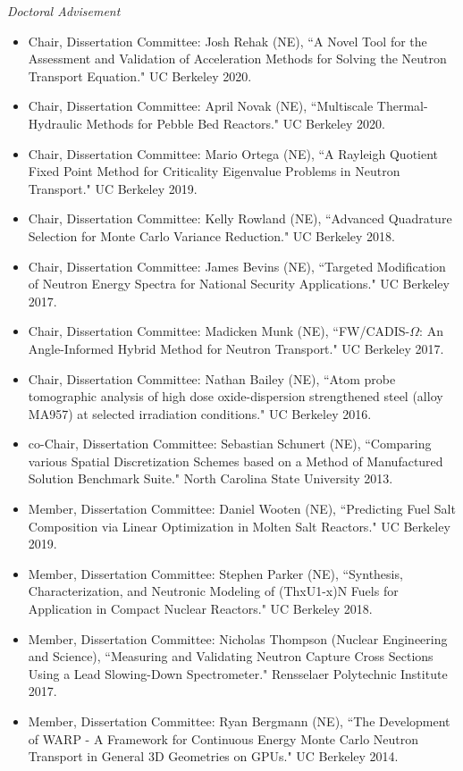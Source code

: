 \textit{Doctoral Advisement}
\begin{itemize}
\item Chair, Dissertation Committee: Josh Rehak (NE), ``A Novel Tool for the Assessment  and Validation of Acceleration Methods for Solving the Neutron Transport Equation." UC Berkeley 2020.
%
\item Chair, Dissertation Committee: April Novak (NE), ``Multiscale
Thermal-Hydraulic Methods for Pebble Bed Reactors." UC Berkeley 2020.
%
\item Chair, Dissertation Committee: Mario Ortega (NE), ``A Rayleigh Quotient Fixed Point Method for Criticality Eigenvalue Problems in Neutron Transport."  UC Berkeley 2019.
%
\item Chair, Dissertation Committee: Kelly Rowland (NE), ``Advanced Quadrature Selection for Monte Carlo Variance Reduction."  UC Berkeley 2018.
%
\item Chair, Dissertation Committee: James Bevins (NE), ``Targeted Modification of Neutron Energy Spectra for National Security Applications."  UC Berkeley 2017.
%
\item Chair, Dissertation Committee: Madicken Munk (NE), ``FW/CADIS-$\Omega$: An Angle-Informed Hybrid Method for Neutron Transport."  UC Berkeley 2017.
%
\item Chair, Dissertation Committee: Nathan Bailey (NE), ``Atom probe tomographic analysis of high dose oxide-dispersion strengthened steel (alloy MA957) at selected irradiation conditions."  UC Berkeley 2016.
%
\item co-Chair, Dissertation Committee: Sebastian Schunert (NE), ``Comparing various Spatial Discretization Schemes based on a Method of Manufactured Solution Benchmark Suite." North Carolina State University 2013.
%
\item Member, Dissertation Committee: Daniel Wooten (NE), ``Predicting Fuel Salt Composition via Linear Optimization in Molten Salt
Reactors."  UC Berkeley 2019.
%
\item Member, Dissertation Committee: Stephen Parker (NE), ``Synthesis, Characterization, and Neutronic Modeling of (ThxU1-x)N Fuels for Application in Compact Nuclear Reactors."  UC Berkeley 2018.
%
\item Member, Dissertation Committee: Nicholas Thompson (Nuclear Engineering and Science), ``Measuring and Validating Neutron Capture Cross Sections Using a Lead Slowing-Down Spectrometer."  Rensselaer Polytechnic Institute 2017.
%
\item Member, Dissertation Committee: Ryan Bergmann (NE), ``The Development of WARP - A Framework for Continuous Energy Monte Carlo Neutron Transport in General 3D Geometries on GPUs."  UC Berkeley 2014.
\end{itemize}


